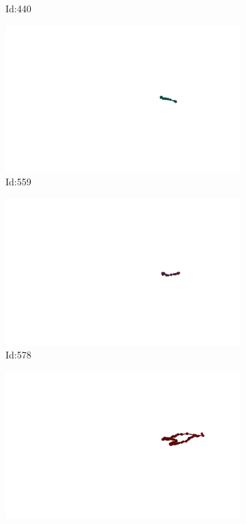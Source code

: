 \documentclass[12pt,twoside]{report}
\begin{document}
\begin{figure}
\begin{subfigure}[b]{0.20\textwidth}
\caption{Id:440}
\end{subfigure}
\begin{subfigure}[b]{0.20\textwidth}
\centering
\includegraphics[width=\textwidth]{../../trajectories/559.png}
\caption{Id:559}
\end{subfigure}
\begin{subfigure}[b]{0.20\textwidth}
\centering
\includegraphics[width=\textwidth]{../../trajectories/578.png}
\caption{Id:578}
\end{subfigure}
\begin{subfigure}[b]{0.20\textwidth}
\centering
\includegraphics[width=\textwidth]{../../trajectories/582.png}

\end{subfigure}
\end{figure}
\end{document}

